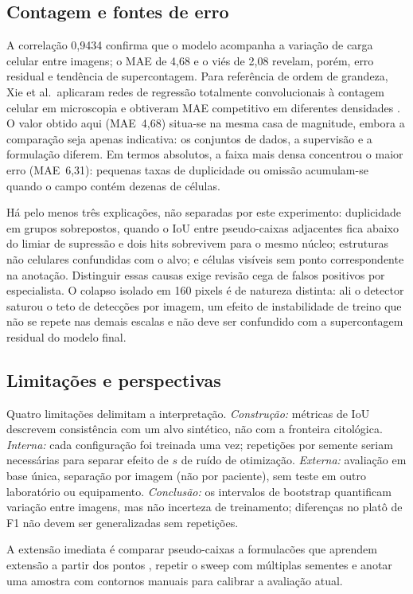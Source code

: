 \subsection{Contagem e fontes de erro}

A correla\c{c}\~ao 0,9434 confirma que o modelo acompanha a varia\c{c}\~ao de
carga celular entre imagens; o MAE de 4,68 e o vi\'es de 2,08 revelam, por\'em,
erro residual e tend\^encia de supercontagem. Para refer\^encia de ordem de grandeza, Xie et al.\ aplicaram redes de regress\~ao
totalmente convolucionais \`a contagem celular em microscopia e obtiveram MAE
competitivo em diferentes densidades \cite{xie2018fcrn}. O valor obtido aqui
(MAE~4,68) situa-se na mesma casa de magnitude, embora a compara\c{c}\~ao seja
apenas indicativa: os conjuntos de dados, a supervis\~ao e a formula\c{c}\~ao
diferem. Em termos absolutos, a faixa mais
densa concentrou o maior erro (MAE~6,31): pequenas taxas de duplicidade ou
omiss\~ao acumulam-se quando o campo cont\'em dezenas de c\'elulas.

H\'a pelo menos tr\^es explica\c{c}\~oes, n\~ao separadas por este experimento:
duplicidade em grupos sobrepostos, quando o IoU entre pseudo-caixas adjacentes
fica abaixo do limiar de supress\~ao e dois hits sobrevivem para o mesmo n\'ucleo;
estruturas n\~ao celulares confundidas com o alvo; e c\'elulas vis\'iveis sem ponto
correspondente na anota\c{c}\~ao. Distinguir essas causas exige revis\~ao cega de
falsos positivos por especialista. O colapso isolado em 160 pixels \'e de natureza
distinta: ali o detector saturou o teto de detec\c{c}\~oes por imagem, um efeito
de instabilidade de treino que n\~ao se repete nas demais escalas e n\~ao deve ser
confundido com a supercontagem residual do modelo final.

\subsection{Limita\c{c}\~oes e perspectivas}

Quatro limita\c{c}\~oes delimitam a interpreta\c{c}\~ao. \emph{Constru\c{c}\~ao:}
m\'etricas de IoU descrevem consist\^encia com um alvo sint\'etico, n\~ao com a
fronteira citol\'ogica. \emph{Interna:} cada configura\c{c}\~ao foi treinada uma
vez; repeti\c{c}\~oes por semente seriam necess\'arias para separar efeito de $s$
de ru\'ido de otimiza\c{c}\~ao. \emph{Externa:} avalia\c{c}\~ao em base \'unica,
separa\c{c}\~ao por imagem (n\~ao por paciente), sem teste em outro laborat\'orio
ou equipamento. \emph{Conclus\~ao:} os intervalos de bootstrap quantificam
varia\c{c}\~ao entre imagens, mas n\~ao incerteza de treinamento; diferen\c{c}as
no plat\^o de F1 n\~ao devem ser generalizadas sem repeti\c{c}\~oes.

A extens\~ao imediata \'e comparar pseudo-caixas a formulac\~oes que aprendem
extens\~ao a partir dos pontos \cite{chen2023p2bnet}, repetir o sweep com
m\'ultiplas sementes e anotar uma amostra com contornos manuais para calibrar a
avalia\c{c}\~ao atual.

